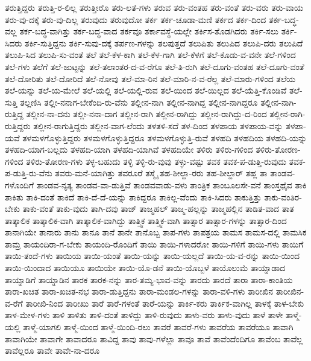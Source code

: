 {ತರುತ್ತಿದ್ದರು
ತರುತ್ತಿ-ರ-ಲಿಲ್ಲ
ತರುತ್ತೀರೊ
ತರು-ಲತೆ-ಗಳು
ತರುವ
ತರು-ವಂತಹ
ತರು-ವಂತೆ
ತರು-ವರು
ತರು-ವಾಯ
ತರು-ವು-ದಕ್ಕೆ
ತರು-ವು-ದಿಲ್ಲ
ತರುವುದು
ತರುವುದೋ
ತರ್ಕ
ತರ್ಕ-ಚೂಡಾ-ಮಣಿ
ತರ್ಕದ
ತರ್ಕ-ದಿಂದ
ತರ್ಕ-ಬದ್ಧ-ವಲ್ಲ
ತರ್ಕ-ಬದ್ಧ-ವಾಗಿತ್ತು
ತರ್ಕ-ಬದ್ಧ-ವಾದ
ತರ್ಕವೂ
ತರ್ಕಾವಸ್ಥೆ-ಯಲ್ಲೇ
ತರ್ಕಿಸ-ತೊಡಗಿದರು
ತರ್ಕಿ-ಸಲು
ತರ್ಕಿ-ಸಿದರು
ತರ್ಕಿ-ಸುತ್ತಿದ್ದನು
ತರ್ಕಿ-ಸುವು-ದಕ್ಕೆ
ತರ್ಪಣ-ಗಳನ್ನು
ತಲಪುತ್ತದೆ
ತಲುಪಿತು
ತಲುಪಿದ
ತಲುಪಿ-ದರು
ತಲುಪಿದೆ
ತಲುಪಿ-ಸಿದ
ತಲುಪಿ-ಸು-ವಂತೆ
ತಲೆ
ತಲೆ-ಕೆಳ-ಕಾಗಿ
ತಲೆ-ಕೆಳ-ಗಾಗಿ
ತಲೆ-ಕೆಳಗೆ
ತಲೆ-ಕೊಡು-ವ-ವನೇ
ತಲೆ-ಗಳಿಂದ
ತಲೆ-ಗಳು
ತಲೆಗೆ
ತಲೆ-ಜುಟ್ಟನ್ನು
ತಲೆ-ತಲಾಂತರ-ದ-ವ-ರೆಗೂ
ತಲೆ-ತಿ-ರುಗಿ
ತಲೆ-ದೂಗು-ವಂತಹ
ತಲೆ-ದೂಗು-ವಂತೆ
ತಲೆ-ದೋರಿತು
ತಲೆ-ದೋರಿದೆ
ತಲೆ-ನೋವು
ತಲೆ-ಮಾ-ರಿನ
ತಲೆ-ಮಾರಿ-ನ-ವ-ರೆಲ್ಲ
ತಲೆ-ಮಾರು-ಗಳಿಂದ
ತಲೆಯ
ತಲೆ-ಯನ್ನು
ತಲೆ-ಯ-ಮೇಲೆ
ತಲೆ-ಯಲ್ಲಿ
ತಲೆ-ಯಲ್ಲಿ-ರುವ
ತಲೆ-ಯಿಂದ
ತಲೆ-ಯಿಲ್ಲದ
ತಲೆ-ಯೆತ್ತಿ-ಕೊಂಡಿವೆ
ತಲೆ-ಸುತ್ತಿ
ತಲ್ಲಣಿಸಿ
ತಲ್ಲೀ-ನನಾಗ-ಬೇಕೆಂದಿ-ರು-ವೆನು
ತಲ್ಲೀನ-ನಾಗಿ
ತಲ್ಲೀನ-ನಾಗಿದ್ದ
ತಲ್ಲೀನ-ನಾಗಿದ್ದರೂ
ತಲ್ಲೀನ-ನಾಗಿ-ರುತ್ತಿದ್ದ
ತಲ್ಲೀನ-ನಾ-ದನು
ತಲ್ಲೀ-ನನಾ-ದಾಗ
ತಲ್ಲೀನ-ರಾಗಿ
ತಲ್ಲೀನ-ರಾಗಿದ್ದು
ತಲ್ಲೀನ-ರಾಗಿದ್ದು-ದ-ರಿಂದ
ತಲ್ಲೀನ-ರಾಗಿ-ರುತ್ತಿದ್ದರು
ತಲ್ಲೀನ-ರಾಗುತ್ತಿದ್ದರು
ತಲ್ಲೀನ-ವಾಗ-ಲೆಂದು
ತಳತಳಿ-ಸದೆ
ತಳ-ದಿಂದ
ತಳಪಾಯ
ತಳಪಾಯ-ವನ್ನು
ತಳಪಾ-ಯವೆ
ತಳಮಳಗೊಳ್ಳುತ್ತಿದ್ದರು
ತಳಮಳಗೊಳ್ಳುತ್ತಿದ್ದರೂ
ತಳಮಳಗೊಳ್ಳುತ್ತಿ-ರುವೆ
ತಳಹದಿ
ತಳಹದಿಯ
ತಳಹದಿ-ಯನ್ನು
ತಳಹದಿ-ಯಾಗ-ಬಲ್ಲದು
ತಳಹದಿ-ಯಾಗಿ
ತಳಹದಿ-ಯಾಗಿವೆ
ತಳಹದಿಯೇ
ತಳಿರು
ತಳಿರು-ಗಳಿಂದ
ತಳಿರು-ತೋರಣ-ಗಳಿಂದ
ತಳಿರು-ತೋರಣ-ಗಳು
ತಳ್ಳ-ಬಹುದು
ತಳ್ಳಿ
ತಳ್ಳಿ-ರು-ವುವು
ತಳ್ಳು-ವಷ್ಟು
ತವಕ
ತವಕ-ಪ-ಡುತ್ತಿ-ರುವುದು
ತವಕ-ಪ-ಡುತ್ತಿ-ರು-ವೆನು
ತವರು-ಮನೆ-ಯಾಗಿತ್ತು
ತವರೂರೆ
ತಸ್ಮೈ
ತಹ-ಶೀಲ್ದಾ-ರರು
ತಹ-ಶೀಲ್ದಾರ್
ತಹ್ಲ
ತಾ
ತಾಂಡವ-ಗಳೊಂದಿಗೆ
ತಾಂಡವ-ನೃತ್ಯ
ತಾಂಡವ-ವಾ-ಡುತ್ತಿವೆ
ತಾಂಡವವಾಡು-ವಳು
ತಾಂತ್ರಿಕ
ತಾಂಬೂಲಸೇ-ವನೆ
ತಾಂಸ್ತಥೈವ
ತಾಕಿ
ತಾಕಿತು
ತಾಕಿ-ದಂತೆ
ತಾಕಿದೆ
ತಾಕಿ-ದೆ-ದೆ-ಯನ್ನು
ತಾಕಿದ್ದರೂ
ತಾಕಿಲ್ಲ-ವೆಂದು
ತಾಕಿ-ಸಿದರು
ತಾಕುತ್ತಿತ್ತು
ತಾಕು-ವಂತಿರ-ಬೇಕು
ತಾಕು-ವಂತೆ
ತಾಕು-ವುದು
ತಾಗಿ-ದವು
ತಾಜ್
ತಾಜ್ಮಹಲ್
ತಾಜ್ಮ-ಹಲ್ಲನ್ನು
ತಾಜ್ಮಹಲ್ಲಿನ
ತಾಡಿತ-ವಾದ
ತಾತ
ತಾತ್ಕಾಲಿಕ
ತಾತ್ಕಾಲಿಕ-ವಾಗಿ
ತಾತ್ಕಾಲಿಕ-ವಾಗಿದ್ದು
ತಾತ್ತ್ವಿಕ
ತಾತ್ತ್ವಿಕ-ವಾಗಿ
ತಾತ್ಸಾರ
ತಾತ್ಸಾರ-ಗಳನ್ನು
ತಾತ್ಸಾರ-ದಿಂದ
ತಾನಾಗಿಯೇ
ತಾನಾರು
ತಾನು
ತಾನೂ
ತಾನೆ
ತಾನೇ
ತಾನೊಬ್ಬ
ತಾಪ-ಗಳು
ತಾಪತ್ರಯ
ತಾಮಸ
ತಾಮಸ-ದಲ್ಲಿ
ತಾಮಸಿಕ
ತಾಮ್ರ
ತಾಯಂದಿರಾ-ಗ-ಬೇಕು
ತಾಯಂದಿ-ರೊಂದಿಗೆ
ತಾಯಿ
ತಾಯಿ-ಗಳಾದರೋ
ತಾಯಿ-ಗಳಿಗೆ
ತಾಯಿ-ಗಳು
ತಾಯಿಗೆ
ತಾಯಿ-ತಂದೆ-ಗಳು
ತಾಯಿಯ
ತಾಯಿ-ಯಂತೆ
ತಾಯಿ-ಯನ್ನು
ತಾಯಿ-ಯಲ್ಲದೆ
ತಾಯಿ-ಯ-ವ-ರನ್ನು
ತಾಯಿ-ಯಿಂದ
ತಾಯಿ-ಯಿಂದಾದ
ತಾಯಿಯೂ
ತಾಯಿಯೇ
ತಾಯಿ-ಯೊ-ಡನೆ
ತಾಯಿ-ಯೊಬ್ಬಳೆ
ತಾಯೊಲುಮೆ
ತಾಯ್ನಾಡಾದ
ತಾಯ್ನಾಡಿಗೆ
ತಾಯ್ನಾಡಿನ
ತಾರಕ
ತಾರಕ-ನನ್ನು
ತಾರ-ತಮ್ಯ-ಭಾವ-ವನ್ನು
ತಾರದು
ತಾರದೆ
ತಾರಾ
ತಾರಾ-ಕಾಂತಿಯ
ತಾರಾ-ಖಚಿತ
ತಾರಾ-ಖಚಿತ-ನಭ
ತಾರಾ-ಡುತ್ತಿದ್ದನು
ತಾರಾ-ಮಂಡಲ-ಗಳನ್ನು
ತಾರಾ-ವಳಿ-ಗಳು
ತಾರೀಖಿನ
ತಾರೀಖಿನ-ವ-ರೆಗೆ
ತಾರೀಖಿ-ನಿಂದ
ತಾರೀಖು
ತಾರೆ
ತಾರೆ-ಗಳಂತೆ
ತಾರೆ-ಯನ್ನು
ತಾರ್ಕಿ-ಕರು
ತಾರ್ಕಿಕ-ವಾಗಿಲ್ಲ
ತಾಳಕ್ಕೆ
ತಾಳ-ಬೇಕು
ತಾಳ-ಮೇಳ-ಗಳು
ತಾಳಿ
ತಾಳಿತು
ತಾಳಿ-ದಂತೆ
ತಾಳಿದ್ದು
ತಾಳಿ-ರುವುದು
ತಾಳು-ವರು
ತಾಳು-ವುದು
ತಾಳೆ
ತಾಳೇ
ತಾಳ್ಮೆ-ಯಲ್ಲಿ
ತಾಳ್ಮೆ-ಯಾಗಲಿ
ತಾಳ್ಮೆ-ಯಿಂದ
ತಾಳ್ಮೆ-ಯಿಂದಿ-ರಲು
ತಾವರೆ
ತಾವರೆ-ಗಳು
ತಾವರೆಯ
ತಾವರೆಯೂ
ತಾವಾಗಿ
ತಾವಾಗಿಯೇ
ತಾವಾಗೇ
ತಾವಾದರೂ
ತಾವಿದ್ದ
ತಾವು
ತಾವು-ಗಳೆಲ್ಲಾ
ತಾವೂ
ತಾವೆ
ತಾವೆಂದೆಂದಿಗೂ
ತಾವೆಂಬ
ತಾವೆಲ್ಲ
ತಾವೆಲ್ಲರೂ
ತಾವೇ
ತಾವೇ-ನಾ-ದರೂ
}
